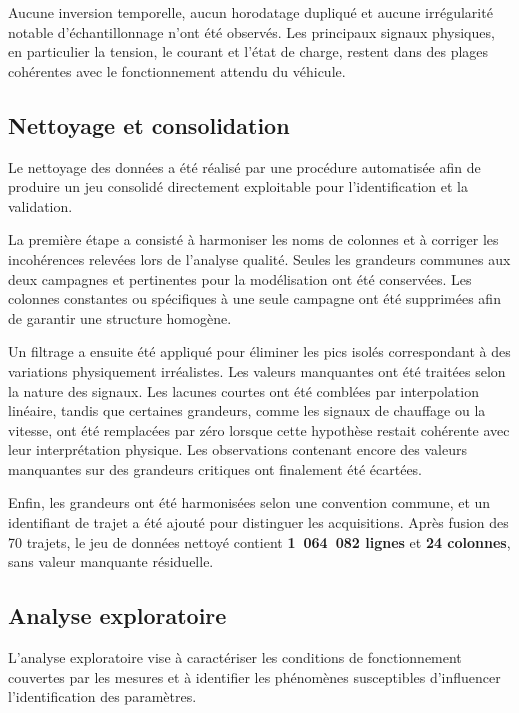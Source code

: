 Aucune inversion temporelle, aucun horodatage dupliqué et aucune irrégularité notable d'échantillonnage n'ont été observés. Les principaux signaux physiques, en particulier la tension, le courant et l'état de charge, restent dans des plages cohérentes avec le fonctionnement attendu du véhicule.

\subsection{Nettoyage et consolidation}
\label{subsec:ch3_nettoyage}

Le nettoyage des données a été réalisé par une procédure automatisée afin de produire un jeu consolidé directement exploitable pour l'identification et la validation.

La première étape a consisté à harmoniser les noms de colonnes et à corriger les incohérences relevées lors de l'analyse qualité. Seules les grandeurs communes aux deux campagnes et pertinentes pour la modélisation ont été conservées. Les colonnes constantes ou spécifiques à une seule campagne ont été supprimées afin de garantir une structure homogène.

Un filtrage a ensuite été appliqué pour éliminer les pics isolés correspondant à des variations physiquement irréalistes. Les valeurs manquantes ont été traitées selon la nature des signaux. Les lacunes courtes ont été comblées par interpolation linéaire, tandis que certaines grandeurs, comme les signaux de chauffage ou la vitesse, ont été remplacées par zéro lorsque cette hypothèse restait cohérente avec leur interprétation physique. Les observations contenant encore des valeurs manquantes sur des grandeurs critiques ont finalement été écartées.

Enfin, les grandeurs ont été harmonisées selon une convention commune, et un identifiant de trajet a été ajouté pour distinguer les acquisitions. Après fusion des 70 trajets, le jeu de données nettoyé contient \textbf{1~064~082 lignes} et \textbf{24 colonnes}, sans valeur manquante résiduelle.

\subsection{Analyse exploratoire}
\label{subsec:ch3_eda}

L'analyse exploratoire vise à caractériser les conditions de fonctionnement couvertes par les mesures et à identifier les phénomènes susceptibles d'influencer l'identification des paramètres.

